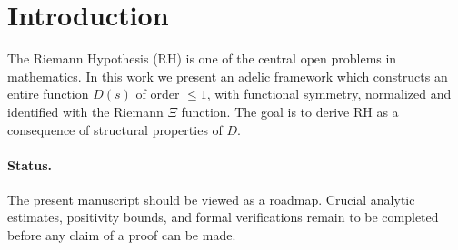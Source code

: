 \section{Introduction}

The Riemann Hypothesis (RH) is one of the central open problems in mathematics.
In this work we present an adelic framework which constructs an entire function $D(s)$
of order $\leq 1$, with functional symmetry, normalized and identified with the Riemann $\Xi$ function.
The goal is to derive RH as a consequence of structural properties of $D$.

\paragraph{Status.}
The present manuscript should be viewed as a roadmap.  Crucial analytic
estimates, positivity bounds, and formal verifications remain to be completed
before any claim of a proof can be made.
